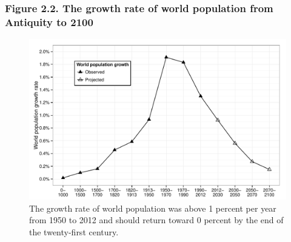 \documentclass[t]{beamer}\usepackage[]{graphicx}\usepackage[]{color}
\newenvironment{knitrout}{}{} %
\begin{document}
\begin{frame}[label=Figure_2_2]
\frametitle{Figure 2.2. The growth rate of world population from Antiquity to 2100}
\begin{figure}[t]
\begin{minipage}[b]{\textwidth}
\centering
\begin{knitrout}\footnotesize
{}\color{fgcolor}

{\centering \includegraphics[width=1\linewidth]{figures/bw/Figure_2_2} 

}



\end{knitrout}
\caption{The growth rate of world population was above 1 percent per year from 1950 to 2012 and should return toward 0 percent by the end of the twenty-first century.}
\end{minipage}
\end{figure}
\end{frame}
\end{document}
